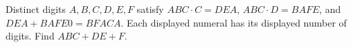 Distinct digits $A,B,C,D,E,F$ satisfy $ABC\cdot C=DEA$, $ABC\cdot D=BAFE$, and $DEA+BAFE0=BFACA$. Each displayed numeral has its displayed number of digits. Find $ABC+DE+F$.
